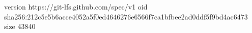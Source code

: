 version https://git-lfs.github.com/spec/v1
oid sha256:212c5e5b6acce4052a5f0ed4646276e6566f7ca1bfbee2ad0ddf5f9bd4ac6473
size 43840
